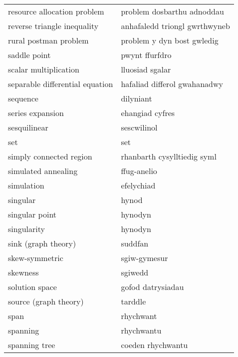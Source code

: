 \begin{supertabular}{p{0.22\textwidth}p{0.22\textwidth}}
      resource allocation problem &       problem dosbarthu adnoddau \\
      reverse triangle inequality &    anhafaledd triongl gwrthwyneb \\
            rural postman problem &       problem y dyn bost gwledig \\
                     saddle point &                   pwynt ffurfdro \\
            scalar multiplication &                  lluosiad sgalar \\
  separable differential equation &     hafaliad differol gwahanadwy \\
                         sequence &                        dilyniant \\
                 series expansion &                  ehangiad cyfres \\
                     sesquilinear &                      sescwilinol \\
                              set &                              set \\
          simply connected region &      rhanbarth cysylltiedig syml \\
              simulated annealing &                      ffug-anelio \\
                       simulation &                       efelychiad \\
                         singular &                            hynod \\
                   singular point &                          hynodyn \\
                      singularity &                          hynodyn \\
              sink (graph theory) &                          suddfan \\
                   skew-symmetric &                     sgiw-gymesur \\
                         skewness &                          sgiwedd \\
                   solution space &                gofod datrysiadau \\
            source (graph theory) &                          tarddle \\
                             span &                        rhychwant \\
                         spanning &                       rhychwantu \\
                    spanning tree &                coeden rhychwantu \\

\end{supertabular}
